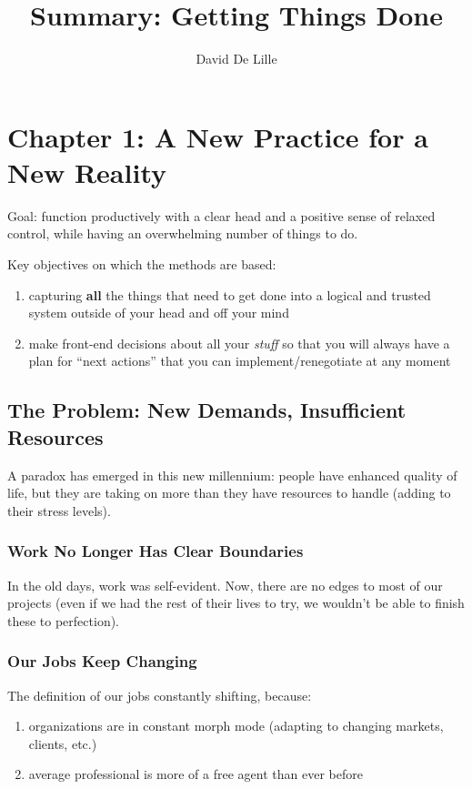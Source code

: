 \documentclass[letterpaper]{article}
\author{David De Lille}
\title{Summary: Getting Things Done}
\newcommand{\p}{\vspace{1em}\par}		%
\begin{document}
\maketitle

\section{Chapter 1: A New Practice for a New Reality}
Goal: function productively with a clear head and a
positive sense of relaxed control, while having an overwhelming number of
things to do.

\p Key objectives on which the methods are based:
\begin{enumerate}
\item capturing \textbf{all} the things that need to get done into a logical and trusted system outside of your head and off your mind
\item make front-end decisions about all your \textit{stuff} so that you will always have a plan for ``next actions'' that you can implement/renegotiate at any moment
\end{enumerate}

\subsection{The Problem: New Demands, Insufficient Resources}
A paradox has emerged in this new millennium: people have enhanced quality of life, but they are taking on more than they have resources to handle (adding to their stress levels).

\subsubsection*{Work No Longer Has Clear Boundaries}
In the old days, work was self-evident. Now, there are no edges to most of our projects (even if we had the rest of their lives to try, we wouldn't be able to finish these to perfection). 

\subsubsection*{Our Jobs Keep Changing}
The definition of our jobs constantly shifting, because:
\begin{enumerate}
\item organizations are in constant morph mode (adapting to changing markets, clients, etc.)
\item average professional is more of a free agent than ever before
\end{enumerate}
\end{document}
